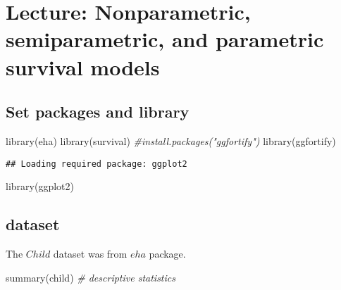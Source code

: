 \documentclass[
]{book}
\newenvironment{Shaded}{\begin{snugshade}}{\end{snugshade}}
\newcommand{\CommentTok}[1]{\textcolor[rgb]{0.56,0.35,0.01}{\textit{#1}}}
\newcommand{\FunctionTok}[1]{\textcolor[rgb]{0.00,0.00,0.00}{#1}}
\newcommand{\NormalTok}[1]{#1}
\begin{document}
\hypertarget{lecture-nonparametric-semiparametric-and-parametric-survival-models}{%
\chapter{Lecture: Nonparametric, semiparametric, and parametric survival models}\label{lecture-nonparametric-semiparametric-and-parametric-survival-models}}

\hypertarget{set-packages-and-library}{%
\section{Set packages and library}\label{set-packages-and-library}}

\begin{Shaded}
\begin{Highlighting}[]
\FunctionTok{library}\NormalTok{(eha)}
\FunctionTok{library}\NormalTok{(survival)}
\CommentTok{\#install.packages("ggfortify")}
\FunctionTok{library}\NormalTok{(ggfortify)}
\end{Highlighting}
\end{Shaded}

\begin{verbatim}
## Loading required package: ggplot2
\end{verbatim}

\begin{Shaded}
\begin{Highlighting}[]
\FunctionTok{library}\NormalTok{(ggplot2)}
\end{Highlighting}
\end{Shaded}

\hypertarget{dataset}{%
\section{dataset}\label{dataset}}

The \(Child\) dataset was from \(eha\) package.

\begin{Shaded}
\begin{Highlighting}[]
\FunctionTok{summary}\NormalTok{(child) }\CommentTok{\# descriptive statistics}
\end{Highlighting}
\end{Shaded}
\end{document}
